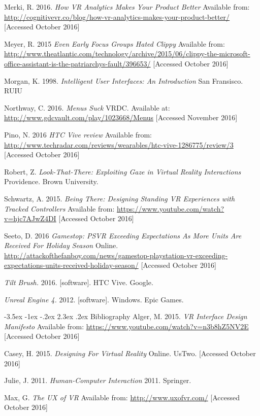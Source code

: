 \documentclass[12pt]{article}
\makeatletter
\renewcommand{\section}{\@startsection {section}{1}{\z@}%
             {-3.5ex \@plus -1ex \@minus -.2ex}%
             {2.3ex \@plus .2ex}%
             {\normalfont\Large\scshape\bfseries}}
\makeatother
\begin{document}
Merki, R. 2016. \emph{How VR Analytics Makes Your Product Better} Available from: \url{http://cognitivevr.co/blog/how-vr-analytics-makes-your-product-better/} [Accessed October 2016]

Meyer, R. 2015 \emph{Even Early Focus Groups Hated Clippy} Available from: \url{http://www.theatlantic.com/technology/archive/2015/06/clippy-the-microsoft-office-assistant-is-the-patriarchys-fault/396653/} [Accessed October 2016]

Morgan, K. 1998. \emph{Intelligent User Interfaces: An Introduction} San Fransisco. RUIU 

Northway, C. 2016. \emph{Menus Suck} VRDC. Available at: \url{http://www.gdcvault.com/play/1023668/Menus} [Accessed November 2016]

Pino, N. 2016 \emph{HTC Vive review} Available from: \url{http://www.techradar.com/reviews/wearables/htc-vive-1286775/review/3} [Accessed October 2016]

Robert, Z. \emph{Look-That-There: Exploiting Gaze in Virtual Reality Interactions} Providence. Brown University. 

Schwartz, A. 2015. \emph{Being There: Designing Standing VR Experiences with Tracked Controllers} Available from: \url{https://www.youtube.com/watch?v=hjc7AJwZ4DI} [Accessed October 2016]
	
Seeto, D. 2016 \emph{Gamestop: PSVR Exceeding Expectations As More Units Are Received For Holiday Season} Online. \url{http://attackofthefanboy.com/news/gamestop-playstation-vr-exceeding-expectations-units-received-holiday-season/} [Accessed October 2016]

\emph{Tilt Brush.} 2016. [software]. HTC Vive. Google. 

\emph{Unreal Engine 4.} 2012. [software]. Windows. Epic Games. 


\section{Bibliography}
Alger, M. 2015. \emph{VR Interface Design Manifesto} Available from: \url{https://www.youtube.com/watch?v=n3b8hZ5NV2E} [Accessed October 2016]

Casey, H. 2015. \emph{Designing For Virtual Reality} Online. UsTwo. [Accessed October 2016]

Julie, J. 2011. \emph{Human-Computer Interaction} 2011. Springer. 

Max, G. \emph{The UX of VR} Available from: \url{http://www.uxofvr.com/} [Accessed October 2016]
\end{document}
